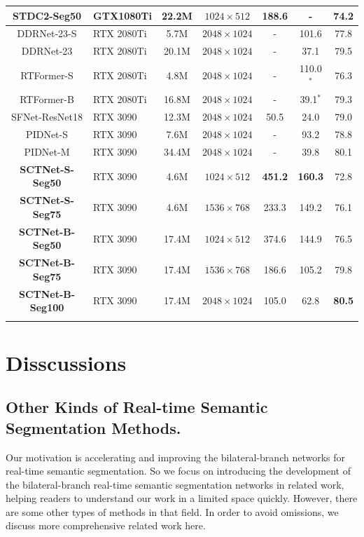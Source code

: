 \documentclass[letterpaper]{article} %
\begin{document}
\begin{table}[t]
\begin{tabular}{c|l|c|c|c|c|c}
    STDC2-Seg50 &GTX1080Ti &22.2M &$1024 \times 512$ &188.6 &-  &74.2 \\
    \hline
    DDRNet-23-S &RTX 2080Ti  &5.7M &$2048 \times 1024$ &- &101.6 &77.8 \\
    DDRNet-23 &RTX 2080Ti  &20.1M &$2048 \times 1024$ &- &37.1 &79.5 \\
    RTFormer-S &RTX 2080Ti    &4.8M &$2048 \times 1024$ &- &110.0$^*$ &76.3 \\
    RTFormer-B &RTX 2080Ti    &16.8M &$2048 \times 1024$ &- &39.1$^*$ &79.3 \\
    \hline
    SFNet-ResNet18  &RTX 3090 &12.3M  &$2048 \times 1024$ &50.5 &24.0 &79.0  \\
    PIDNet-S  &RTX 3090  &7.6M &$2048 \times 1024$ &- &93.2 &78.8 \\    
    PIDNet-M  &RTX 3090  &34.4M &$2048 \times 1024$ &- &39.8 &80.1 \\    
    \hline
    \textbf{SCTNet-S-Seg50}  &RTX 3090 &4.6M &$1024 \times 512$ &\textbf{451.2} &\textbf{160.3} &72.8\\
    \textbf{SCTNet-S-Seg75} &RTX 3090 &4.6M &$1536 \times 768$ &233.3 &149.2 &76.1 \\
    \textbf{SCTNet-B-Seg50}  &RTX 3090 &17.4M &$1024 \times 512$ &374.6 &144.9 &76.5 \\
    \textbf{SCTNet-B-Seg75}  &RTX 3090 &17.4M &$1536 \times 768$ &186.6 &105.2 &79.8\\
    \textbf{SCTNet-B-Seg100} &RTX 3090 &17.4M &$2048 \times 1024$ &105.0  &62.8 &\textbf{80.5} \\
    \Xhline{1pt}
  \end{tabular}
\end{table}


\section{Disscussions}\label{section:D}
\subsection{Other Kinds of Real-time Semantic Segmentation Methods.} 
Our motivation is accelerating and improving the bilateral-branch networks for real-time semantic segmentation. So we focus on introducing the development of the bilateral-branch real-time semantic segmentation networks in related work, helping readers to understand our work in a limited space quickly. However, there are some other types of methods in that field. In order to avoid omissions, we discuss more comprehensive related work here.
\end{document}
